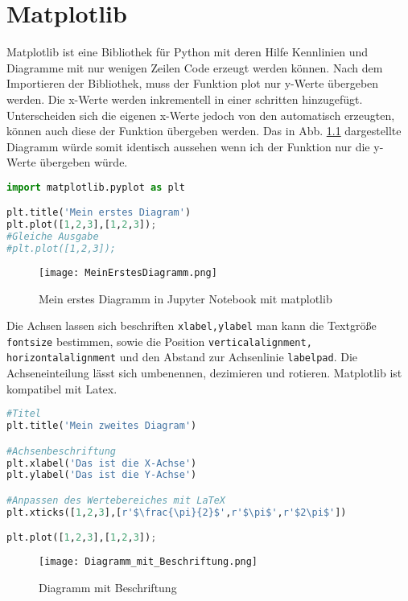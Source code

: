 \chapter{Matplotlib} \label{chap:matplotlib}

Matplotlib ist eine Bibliothek für Python mit deren Hilfe  Kennlinien und Diagramme mit nur wenigen Zeilen Code erzeugt werden können.  Nach dem Importieren der Bibliothek, muss der Funktion plot nur y-Werte übergeben werden. Die x-Werte werden inkrementell in einer schritten hinzugefügt. Unterscheiden sich die eigenen x-Werte jedoch von den automatisch erzeugten, können auch diese der Funktion übergeben werden. Das in Abb. \ref{img:MPL1} dargestellte Diagramm würde somit identisch aussehen wenn ich der Funktion nur die y-Werte übergeben würde. 

\begin{lstlisting}[caption= eine Gerade in Python, label=ObjektinitialisierungPython,language=Python]
import matplotlib.pyplot as plt

plt.title('Mein erstes Diagram')
plt.plot([1,2,3],[1,2,3]);
#Gleiche Ausgabe
#plt.plot([1,2,3]);
\end{lstlisting}


\begin{figure}[!htb]
\centering
\texttt{[image: MeinErstesDiagramm.png]}
\caption{Mein erstes Diagramm in Jupyter Notebook mit matplotlib }
\label{img:MPL1}
\end{figure}

Die Achsen lassen sich beschriften \texttt{xlabel,ylabel} man kann die Textgröße \texttt{fontsize}  bestimmen, sowie die Position \texttt{verticalalignment, horizontalalignment} und den Abstand zur Achsenlinie \texttt{labelpad}. Die Achseneinteilung lässt sich umbenennen, dezimieren und rotieren. Matplotlib ist kompatibel mit Latex. 

\begin{lstlisting}[caption= Diagramm mit Beschriftung, label=lst: DiagrammMitBeschriftung,language=Python]
#Titel
plt.title('Mein zweites Diagram')

#Achsenbeschriftung
plt.xlabel('Das ist die X-Achse')
plt.ylabel('Das ist die Y-Achse')

#Anpassen des Wertebereiches mit LaTeX
plt.xticks([1,2,3],[r'$\frac{\pi}{2}$',r'$\pi$',r'$2\pi$'])

plt.plot([1,2,3],[1,2,3]);
\end{lstlisting}

\begin{figure}[!htb]
\centering
\texttt{[image: Diagramm\_mit\_Beschriftung.png]}
\caption{Diagramm mit Beschriftung}
\label{img:DiagrammMitBeschriftung}
\end{figure}

